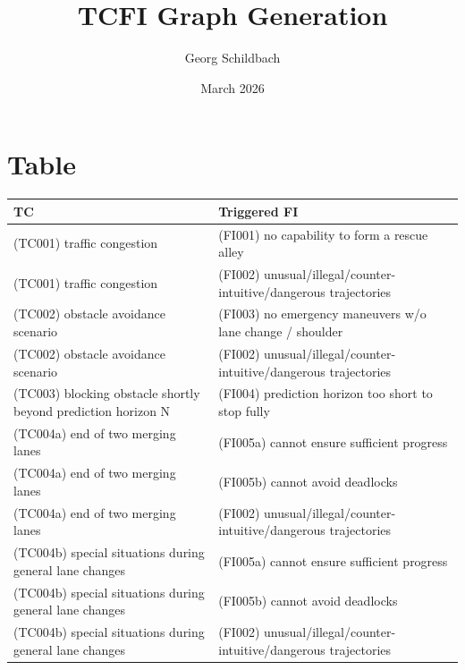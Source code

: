 \documentclass{article}
\title{TCFI Graph Generation}
\author{Georg Schildbach}
\date{March 2026}
\begin{document}
\maketitle

\section{Table}


\centering
\renewcommand{\arraystretch}{1.2}
\setlength{\tabcolsep}{4pt}
\begin{longtable}{|p{8cm}|p{8cm}|}
\hline
\textbf{TC} & \textbf{Triggered FI}\\
\hline\hline
\cellcolor{cGreen}(TC001) traffic congestion& \cellcolor{cGray}(FI001) no capability to form a rescue alley\\\hline
\cellcolor{cGreen}(TC001) traffic congestion& \cellcolor{cBlue}(FI002) unusual/illegal/counter-intuitive/dangerous trajectories\\\hline
\cellcolor{cGreen}(TC002) obstacle avoidance scenario& \cellcolor{cGray}(FI003) no emergency maneuvers w/o lane change / shoulder\\\hline
\cellcolor{cGreen}(TC002) obstacle avoidance scenario& \cellcolor{cBlue}(FI002) unusual/illegal/counter-intuitive/dangerous trajectories\\\hline
\cellcolor{cViolet}(TC003) blocking obstacle shortly beyond prediction horizon N& \cellcolor{cBlue}(FI004) prediction horizon too short to stop fully\\\hline
\cellcolor{cYellow}(TC004a) end of two merging lanes& \cellcolor{cBlue}(FI005a) cannot ensure sufficient progress\\\hline
\cellcolor{cYellow}(TC004a) end of two merging lanes& \cellcolor{cBlue}(FI005b) cannot avoid deadlocks\\\hline
\cellcolor{cYellow}(TC004a) end of two merging lanes& \cellcolor{cBlue}(FI002) unusual/illegal/counter-intuitive/dangerous trajectories\\\hline
\cellcolor{cYellow}(TC004b) special situations during general lane changes& \cellcolor{cBlue}(FI005a) cannot ensure sufficient progress\\\hline
\cellcolor{cYellow}(TC004b) special situations during general lane changes& \cellcolor{cBlue}(FI005b) cannot avoid deadlocks\\\hline
\cellcolor{cYellow}(TC004b) special situations during general lane changes& \cellcolor{cBlue}(FI002) unusual/illegal/counter-intuitive/dangerous trajectories\\\hline

\end{longtable}
\end{document}

